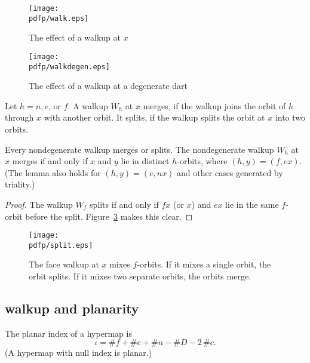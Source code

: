 \begin{figure}[htb]
  \centering
  \texttt{[image: \\pdfp/walk.eps]}
  \caption{The effect of a walkup at $x$}
  \label{fig:walk}
\end{figure}


\begin{figure}[htb]
  \centering
  \texttt{[image: \\pdfp/walkdegen.eps]}
  \caption{The effect of a walkup at a degenerate dart}
  \label{fig:walkdegen}
\end{figure}


\begin{definition} Let $h=n,e$, or $f$.
A walkup $W_h$ at $x$ merges,
if the walkup joins the orbit of $h$ through $x$ with another orbit.  
It splits, if the walkup splits the orbit at $x$ into two orbits.
\end{definition}

\begin{lemma} 
Every nondegenerate walkup merges or splits. The nondegenerate walkup $W_h$ at $x$ merges if and only if $x$ and $y$  lie in distinct $h$-orbits, where $(h,y)=(f,e x)$.   (The lemma also holds for $(h,y)=(e,n x)$ and other cases generated
by triality.)
\end{lemma}

\begin{proof} The walkup $W_f$ splits if and only if $f x$ 
(or $x$)
and $e x$ lie in the same $f$-orbit before the split. 
Figure~\ref{fig:split} makes this clear.
\end{proof}


\begin{figure}[htb]
  \centering
  \texttt{[image: \\pdfp/split.eps]}
  \caption{The face walkup at $x$ mixes $f$-orbits.   If it mixes a single orbit,   the orbit splits. If it mixes   two separate    orbits, the orbits merge. }
  \label{fig:split}
\end{figure}


\subsection{walkup and planarity}

\begin{definition} The planar index of a hypermap is
$$\iota = \# f + \# e + \# n - \# D - 2\,\# c.$$
(A hypermap with null index is planar.)
\end{definition}


